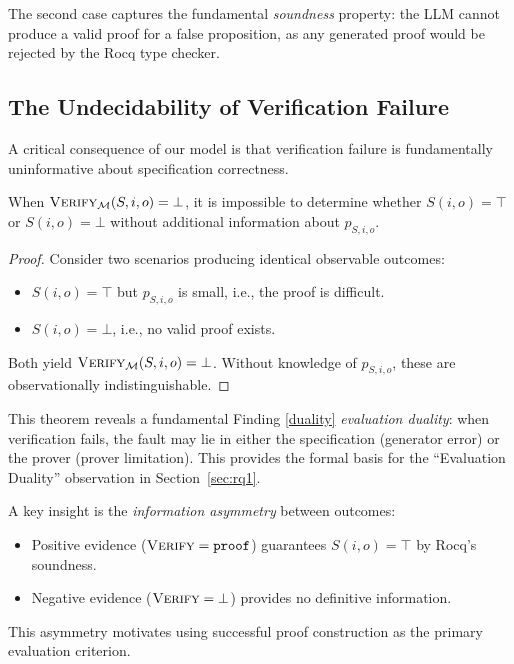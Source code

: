 The second case captures the fundamental \emph{soundness} property: the LLM cannot produce a valid proof for a false proposition, as any generated proof would be rejected by the Rocq type checker.

\subsection{The Undecidability of Verification Failure}

A critical consequence of our model is that verification failure is fundamentally uninformative about specification correctness.

\begin{theorem}
\label{thm:undecidability}
When $\textsc{Verify}_{\mathcal{M}}(S, i, o) = \bot$, it is impossible to determine whether $S(i, o) = \top$ or $S(i, o) = \bot$ without additional information about $p_{S,i,o}$.
\end{theorem}

\begin{proof}
Consider two scenarios producing identical observable outcomes:
\begin{itemize}[leftmargin=1.5em, itemsep=2pt, topsep=2pt]
    \item $S(i, o) = \top$ but $p_{S,i,o}$ is small, i.e., the proof is difficult.
    \item $S(i, o) = \bot$, i.e., no valid proof exists.
\end{itemize}
Both yield $\textsc{Verify}_{\mathcal{M}}(S, i, o) = \bot$. Without knowledge of $p_{S,i,o}$, these are observationally indistinguishable.
\end{proof}

This theorem reveals a fundamental Finding \ref{duality} \emph{evaluation duality}: when verification fails, the fault may lie in either the specification (generator error) or the prover (prover limitation). This provides the formal basis for the ``Evaluation Duality'' observation in Section~\ref{sec:rq1}.

A key insight is the \emph{information asymmetry} between outcomes:
\begin{itemize}[leftmargin=1.5em, itemsep=2pt, topsep=2pt]
    \item Positive evidence ($\textsc{Verify} = \texttt{proof}$) guarantees $S(i,o) = \top$ by Rocq's soundness.
    \item Negative evidence ($\textsc{Verify} = \bot$) provides no definitive information.
\end{itemize}
This asymmetry motivates using successful proof construction as the primary evaluation criterion.

